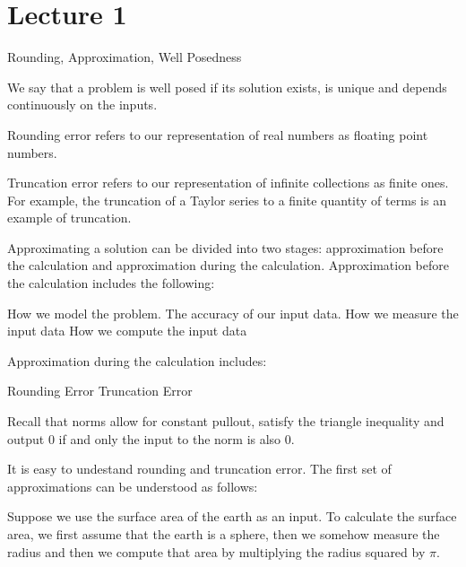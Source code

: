 \documentclass[../main.tex]{subfiles}
\begin{document}
\section{Lecture 1}{Rounding, Approximation, Well Posedness}

\begin{definition}
    We say that a problem is well posed if its solution exists, is unique and depends continuously on the inputs.
\end{definition}

\begin{definition}
    Rounding error refers to our representation of real numbers as floating point numbers.
\end{definition}

\begin{definition}
    Truncation error refers to our representation of infinite collections as finite ones. For example, the truncation of a Taylor
    series to a finite quantity of terms is an example of truncation.
\end{definition}

\begin{definition}
    Approximating a solution can be divided into two stages: approximation before the calculation and approximation during the calculation. Approximation before the calculation includes the following:

    \begin{outline}
        \1 How we model the problem.
        \1 The accuracy of our input data.
        \2 How we measure the input data
        \2 How we compute the input data
    \end{outline}

    Approximation during the calculation includes:

    \begin{outline}
        \1 Rounding Error
        \1 Truncation Error
    \end{outline}

    \begin{remark}
        Recall that norms allow for constant pullout, satisfy the triangle inequality and output $0$ if and only the input to the
        norm is also $0$.
    \end{remark}

\end{definition}

\begin{example}
    It is easy to undestand rounding and truncation error. The first set of approximations can be understood as follows:

    Suppose we use the surface area of the earth as an input. To calculate the surface area, we first assume that the earth
    is a sphere, then we somehow measure the radius and then we compute that area by multiplying the radius squared by $\pi$.
\end{example}
\end{document}
